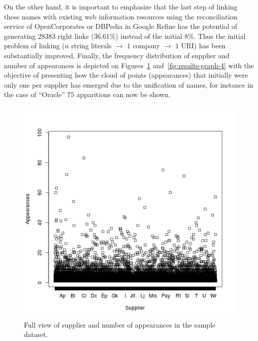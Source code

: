 \documentclass{llncs}
\begin{document}
On the other hand, it is important to emphasize that the last step of linking these names 
with existing web information resources using the reconciliation service of 
OpenCorporates or DBPedia in Google Refine has the potential of generating $28383$ right 
links ($36.61$\%) instead of the initial $8$\%. Thus the initial problem of linking ($n$ string literals $\to$ 
$1$ company $\to$ $1$ URI) has been substantially improved. Finally, the frequency distribution of supplier and number of appearances is depicted on Figures~\ref{fig:results-graph-3}
and~\ref{fig:results-graph-4} with the objective of presenting how the cloud of points (appearances) that initially were only one per supplier has 
emerged due to the unification of names, for instance in the case of ``Oracle'' $75$ apparitions can 
now be shown.


\begin{figure}[ht]
\begin{minipage}[b]{0.45\linewidth}
\centering
	\includegraphics[width=\textwidth]{./imgs/corfu-stats}
 \caption{Full view of supplier and number of appearances in the sample dataset.}
 \label{fig:results-graph-3}
\end{minipage}
\hspace{0.5cm}
\begin{minipage}[b]{0.45\linewidth}
\centering

\end{minipage}
\end{figure}
\end{document}
